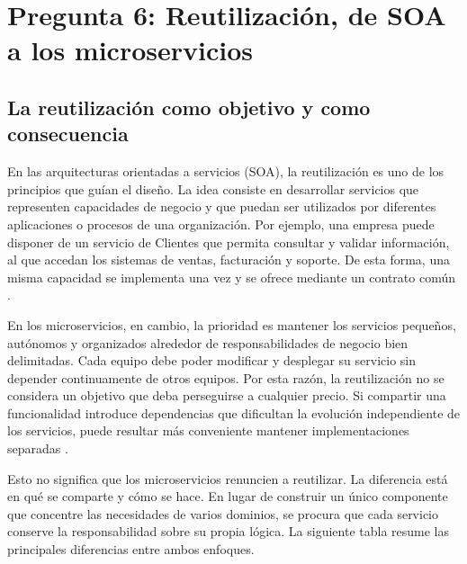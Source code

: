 
\section{Pregunta 6: Reutilización, de SOA a los microservicios}

\subsection{La reutilización como objetivo y como consecuencia}

En las arquitecturas orientadas a servicios (SOA), la reutilización es uno de los principios que guían el diseño. La idea consiste en desarrollar servicios que representen capacidades de negocio y que puedan ser utilizados por diferentes aplicaciones o procesos de una organización. Por ejemplo, una empresa puede disponer de un servicio de Clientes que permita consultar y validar información, al que accedan los sistemas de ventas, facturación y soporte. De esta forma, una misma capacidad se implementa una vez y se ofrece mediante un contrato común \parencite{richards2020fundamentals}.

En los microservicios, en cambio, la prioridad es mantener los servicios pequeños, autónomos y organizados alrededor de responsabilidades de negocio bien delimitadas. Cada equipo debe poder modificar y desplegar su servicio sin depender continuamente de otros equipos. Por esta razón, la reutilización no se considera un objetivo que deba perseguirse a cualquier precio. Si compartir una funcionalidad introduce dependencias que dificultan la evolución independiente de los servicios, puede resultar más conveniente mantener implementaciones separadas \parencite{ford2021hard}.

Esto no significa que los microservicios renuncien a reutilizar. La diferencia está en qué se comparte y cómo se hace. En lugar de construir un único componente que concentre las necesidades de varios dominios, se procura que cada servicio conserve la responsabilidad sobre su propia lógica. La siguiente tabla resume las principales diferencias entre ambos enfoques.

